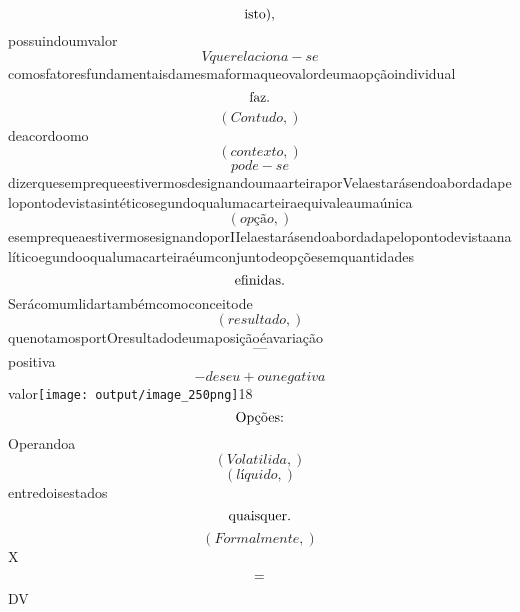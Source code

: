 \documentclass{article}
\begin{document}
\begin{equation}
$isto),$
\end{equation}possuindoumvalor\begin{equation}
Vquerelaciona - se
\end{equation}comosfatoresfundamentaisdamesmaformaqueovalordeumaopçãoindividual\begin{equation}
$faz.$
\end{equation}\begin{equation}
\left( Contudo,\right)
\end{equation}deacordoomo\begin{equation}
\left( contexto,\right)
\end{equation}\begin{equation}
pode - se
\end{equation}dizerquesemprequeestivermosdesignandoumaarteiraporVelaestarásendoabordadapelopontodevistasintéticosegundoqualumacarteiraequivaleaumaúnica\begin{equation}
\left( opção,\right)
\end{equation}esemprequeaestivermosesignandoporIIelaestarásendoabordadapelopontodevistaanalíticoegundooqualumacarteiraéumconjuntodeopçõesemquantidades\begin{equation}
$efinidas.$
\end{equation}Serácomumlidartambémcomoconceitode\begin{equation}
\left( resultado,\right)
\end{equation}quenotamosportOresultadodeumaposiçãoéavariação\begin{equation}
—
\end{equation}positiva\begin{equation}
- deseu + ounegativa
\end{equation}valor\texttt{[image: output/image\_250png]}18\begin{equation}
$Opções:$
\end{equation}Operandoa\begin{equation}
\left( Volatilida,\right)
\end{equation}\begin{equation}
\left( líquido,\right)
\end{equation}entredoisestados\begin{equation}
$quaisquer.$
\end{equation}\begin{equation}
\left( Formalmente,\right)
\end{equation}X\begin{equation}
$=$
\end{equation}DV\begin{equation}

\end{equation}
\end{document}
